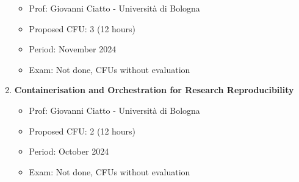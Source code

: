 \documentclass[runningheads]{llncs}
\begin{document}
\begin{enumerate}
    \begin{itemize}
        \item Prof: Giovanni Ciatto - Università di Bologna      
        \item Proposed CFU: 3 (12 hours) 
        \item Period: November 2024
        \item Exam: Not done, CFUs without evaluation
    \end{itemize} 
    \item \textbf{Containerisation and Orchestration for Research Reproducibility} 
    \begin{itemize}
        \item Prof: Giovanni Ciatto - Università di Bologna      
        \item Proposed CFU: 2 (12 hours) 
        \item Period: October 2024
        \item Exam: Not done, CFUs without evaluation
    \end{itemize} 
    
\end{enumerate}
%
%
%


%




\end{document}
